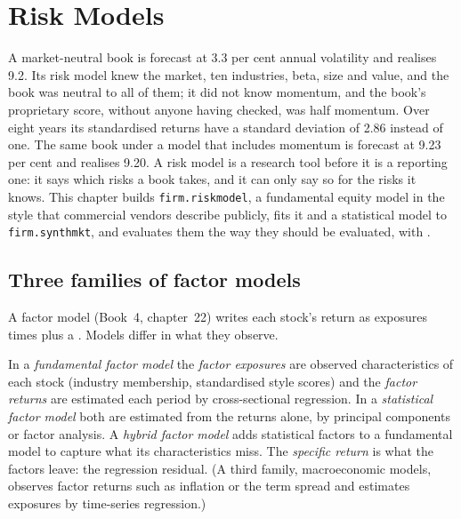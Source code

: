 \chapter{Risk Models}\label{ch:rs:risk-models}

A market-neutral book is forecast at 3.3 per cent annual volatility and realises 9.2. Its risk model knew the market, ten industries, beta, size and value,
and the book was neutral to all of them; it did not know momentum, and the book's proprietary score, without anyone having checked, was half momentum. Over
eight years its standardised returns have a standard deviation of 2.86 instead of one. The same book under a model that includes momentum is forecast at
9.23 per cent and realises 9.20. A risk model is a research tool before it is a reporting one: it says which risks a book takes, and it can
only say so for the risks it knows. This chapter builds \texttt{firm.riskmodel}, a fundamental equity model in the style that commercial vendors describe
publicly, fits it and a statistical model to \texttt{firm.synthmkt}, and evaluates them the way they should be evaluated, with .

\section{Three families of factor models}

A factor model (Book~4, chapter~22) writes each stock's return as exposures times  plus a . Models differ in what they observe.

\begin{definition}\label{def:rs:risk-models:families}
In a \emph{fundamental factor model} the \emph{factor exposures} are observed characteristics of each
stock (industry membership, standardised style scores) and the \emph{factor returns} are estimated each period by cross-sectional
regression. In a \emph{statistical factor model} both are estimated from the returns alone, by principal components or
factor analysis. A \emph{hybrid factor model} adds statistical factors to a fundamental model to capture what its characteristics
miss. The \emph{specific return} is what the factors leave: the regression residual. (A third family, macroeconomic models, observes
factor returns such as inflation or the term spread and estimates exposures by time-series regression.)
\end{definition}

